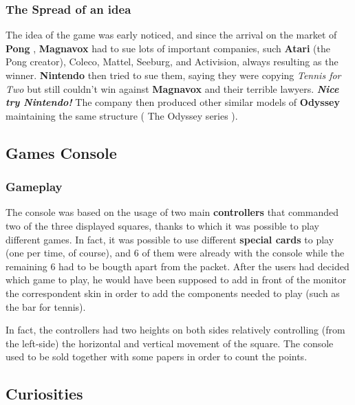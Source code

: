 \documentclass[a4paper,10pt]{book}
\begin{document}
 \subsubsection{The Spread of an idea }
 
          The idea of the game was early noticed, and since the arrival on the market of  \textbf{Pong } ,
           \textbf{Magnavox }  had to sue lots of important companies, such  \textbf{Atari } (the Pong creator),
          Coleco, Mattel, Seeburg, and Activision, always resulting as the winner. 
 \textbf{Nintendo }  then tried to sue them, saying they were copying  \textit{Tennis for Two } but still couldn't win
          against  \textbf{Magnavox }  and their terrible lawyers.  \textbf{\textit{Nice try Nintendo! }} 
          The company then produced other similar models of  \textbf{Odyssey }  maintaining the same structure
          ( The Odyssey series ).
         
 
 \subsection{Games  Console }
 \subsubsection{Gameplay }
 
          The console was based on the usage of two main  \textbf{controllers }  that commanded two of the three
          displayed squares, thanks to which it was possible to play different games. In fact, it was possible to use different
           \textbf{special cards }  to play (one per time, of course), and 6 of them were already with the console while the remaining 6
          had to be bougth apart from the packet. After the users had decided which game to play, he would have been supposed to
          add in front of the monitor the correspondent skin  in order  to add the components needed to play (such as the bar for tennis).
           
          In fact, the controllers had two heights on both sides relatively controlling (from the left-side) the horizontal and vertical
          movement of the square. The console used to be sold together with some papers in order to count the points.
         
 
 
 \subsection{Curiosities }
\end{document}
